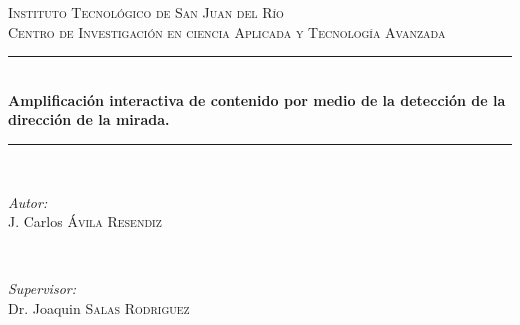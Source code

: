 \documentclass[12pt]{book} %
\begin{document}



\begin{titlepage}

\newcommand{\HRule}{\rule{\linewidth}{0.5mm}} %

\center %
 

\textsc{\LARGE Instituto Tecnológico de San Juan del Río}\\[1.5cm] %
\textsc{\Large Centro de Investigación en ciencia Aplicada y Tecnología Avanzada}\\[0.5cm] %


\HRule \\[0.4cm]
{ \huge \bfseries Amplificación interactiva de contenido por medio de la detección de la dirección de la mirada.}\\[0.4cm] %
\HRule \\[1.5cm]
 

\begin{minipage}{0.4\textwidth}
\begin{flushleft} \large
\emph{Autor:}\\
J. Carlos \textsc{\'Avila Resendiz} %
\end{flushleft}
\end{minipage}
~
\begin{minipage}{0.4\textwidth}
\begin{flushright} \large
\emph{Supervisor:} \\
Dr. Joaquin  \textsc{Salas Rodriguez} %
\end{flushright}
\end{minipage}\\[4cm]


\end{titlepage}
\end{document}
